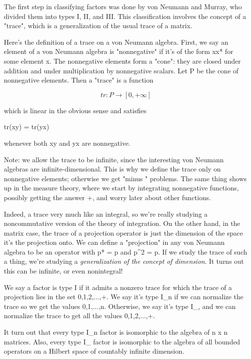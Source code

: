 The first step in classifying factors was done by von Neumann and
Murray, who divided them into types I, II, and III.  This classification
involves the concept of a "trace", which is a generalization
of the usual trace of a matrix.

Here's the definition of a trace on a von Neumann algebra.  First, we
say an element of a von Neumann algebra is "nonnegative" if
it's of the form xx* for some element x.  The nonnegative elements form
a "cone": they are closed under addition and under
multiplication by nonnegative scalars.  Let P be the cone of nonnegative
elements.  Then a "trace" is a function

$$
tr: P \to  [0, +\infty ]
$$
    
which is linear in the obvious sense and satisfies

tr(xy) = tr(yx)

whenever both xy and yx are nonnegative.

Note: we allow the trace to be infinite, since the interesting von
Neumann algebras are infinite-dimensional.   This is why we define 
the trace only on nonnegative elements; otherwise we get "\infty  minus
\infty " problems.  The same thing shows up in the measure theory,
where we start by integrating nonnegative functions, possibly getting
the answer +\infty , and worry later about other functions.

Indeed, a trace very much like an integral, so we're really studying a
noncommutative version of the theory of integration.  On the other hand,
in the matrix case, the trace of a projection operator is just the
dimension of the space it's the projection onto.  We can define a
"projection" in any von Neumann algebra to be an operator with
p* = p and p^{2} = p.  If we study the trace of such a thing,
we're studying a \emph{generalization of the concept of dimension}.  
It turns out this can be infinite, or even nonintegral!

We say a factor is type I if it admits a nonzero trace for
which the trace of a projection lies in the set {0,1,2,...,+\infty }.
We say it's type I_{n} if we can normalize the trace
so we get the values {0,1,...,n}.  Otherwise, we say it's type
I_{\infty }, and we can normalize the trace to get all the 
values {0,1,2,...,+\infty }.

It turn out that every type I_{n} factor is isomorphic to the
algebra of n x n matrices.  Also, every type I_{\infty } factor
is isomorphic to the algebra of all bounded operators on a Hilbert space
of countably infinite dimension.

